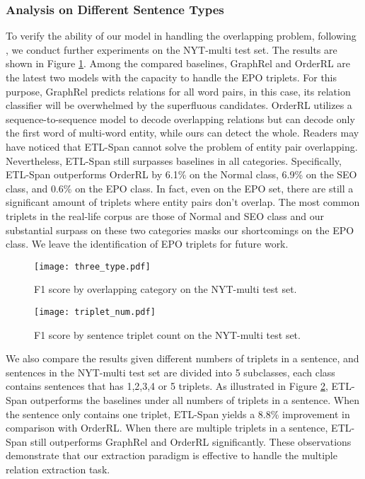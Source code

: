 \documentclass{ecai}
\begin{document}
\subsubsection{Analysis on Different Sentence Types }
To verify the ability of our model in handling the overlapping problem, following \cite{fu-etal-2019-graphrel,zeng2018extracting}, we conduct further experiments on the NYT-multi test set.
The results are shown in Figure \ref{fig:overlap}.
Among the compared baselines, GraphRel and OrderRL are the latest two models with the capacity to handle the EPO triplets. For this purpose, GraphRel predicts relations for all word pairs, in this case, its relation classifier will be overwhelmed by the superfluous candidates. 
OrderRL utilizes a sequence-to-sequence model to decode overlapping relations but can decode only the first word of multi-word entity, while ours can detect the whole.
Readers may have noticed that ETL-Span cannot solve the problem of entity pair overlapping. 
Nevertheless, ETL-Span still surpasses baselines in all categories. 
Specifically, ETL-Span outperforms OrderRL by 6.1\% on the Normal class, 6.9\% on the SEO class, and 0.6\% on the EPO class.
In fact, even on the EPO set, there are still a significant amount of triplets where entity pairs don't overlap.
The most common triplets in the real-life corpus are those of Normal and SEO class and our substantial surpass on these two categories masks our shortcomings on the EPO class. We leave the identification of EPO triplets for future work.
 

\begin{figure}[t]
    \centering
    \texttt{[image: three\_type.pdf]}
    \caption{ F1 score by overlapping category on the NYT-multi test set.} 
     \label{fig:overlap}
\end{figure}

\begin{figure}[t]
    \centering
    \texttt{[image: triplet\_num.pdf]}
    \caption{F1 score by sentence triplet count on the NYT-multi test set.} 
     \label{fig:tripcnt}
\end{figure}


We also compare the results given different numbers of triplets in a sentence, and sentences in the NYT-multi test set are divided into 5 subclasses, each class contains sentences that has 1,2,3,4 or  5 triplets. 
As illustrated in Figure \ref{fig:tripcnt}, ETL-Span outperforms the baselines under all numbers of triplets in a sentence.
When the sentence only contains one triplet, ETL-Span yields a 8.8\% improvement in comparison with OrderRL.
When there are multiple triplets in a sentence, ETL-Span still outperforms GraphRel and OrderRL significantly.
These observations demonstrate that our extraction paradigm is effective to handle the multiple relation extraction task.
\end{document}
